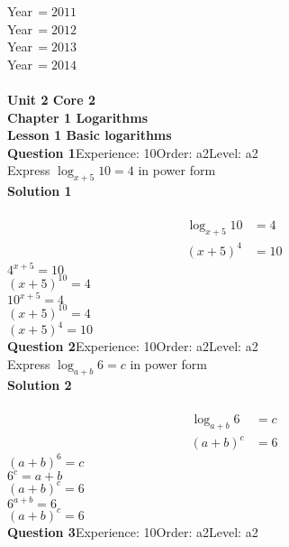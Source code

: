 \documentclass{article}
\begin{document}
Year$\,$$=2011$\\
Year$\,$$=2012$\\
Year$\,$$=2013$\\
Year$\,$$=2014$\\
\\[2pt]
\noindent\huge{\textbf{Unit 2 Core 2}}\\[18pt]
\noindent\huge{\textbf{Chapter 1 Logarithms}}\\[15pt]
\noindent\large{\textbf{Lesson 1 Basic logarithms}}\\[12pt]
\noindent\textbf{Question 1}\hspace{20pt}Experience: 10\hspace{20pt}Order: a2\hspace{20pt}Level: a2\\[2pt]
Express $\log_{x+5}10=4$ in power form\\[4pt]
\noindent\textbf{Solution 1}\\[2pt]
\\[-10pt]\begin{align*}
\log_{x+5}10&=4\\[2pt]
(x+5)^4&=10
\end{align*}
$4^{x+5}=10$\\
$(x+5)^{10}=4$\\
$10^{x+5}=4$\\
$(x+5)^{10}=4$\\
$(x+5)^4=10$\\
\noindent\textbf{Question 2}\hspace{20pt}Experience: 10\hspace{20pt}Order: a2\hspace{20pt}Level: a2\\[2pt]
Express $\log_{a+b}6=c$ in power form\\[4pt]
\noindent\textbf{Solution 2}\\[2pt]
\\[-10pt]\begin{align*}
\log_{a+b}6&=c\\[2pt]
(a+b)^c&=6
\end{align*}
$(a+b)^6=c$\\
$6^c=a+b$\\
$(a+b)^c=6$\\
$6^{a+b}=6$\\
$(a+b)^c=6$\\
\noindent\textbf{Question 3}\hspace{20pt}Experience: 10\hspace{20pt}Order: a2\hspace{20pt}Level: a2\\[2pt]
\end{document}
